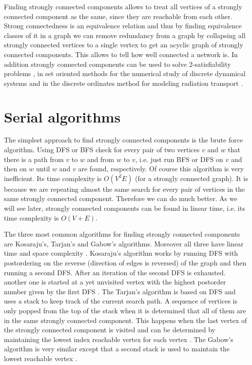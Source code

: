 \documentclass{report}
\theoremstyle{plain}
\theoremstyle{definition}
\theoremstyle{remark}
\numberwithin{definition}{chapter}
\numberwithin{example}{chapter}
\numberwithin{figure}{chapter}
\numberwithin{theorem}{chapter}
\numberwithin{lemma}{chapter}
\begin{document}
Finding strongly connected components allows to treat all vertices of a strongly connected component as the same, since they are reachable from each other. Strong connectedness is an equivalence relation and thus by finding equivalence classes of it in a graph we can remove redundancy from a graph by collapsing all strongly connected vertices to a single vertex to get an acyclic graph of strongly connected components. This allows to tell how well connected a network is. In addition strongly connected components can be used to solve 2-satisfiability problems \cite{aspvall1979linear}, in set oriented methods for the numerical study of discrete dynamical systems \cite{dellnitz2002set} and in the discrete ordinates method for modeling radiation transport \cite{fleischer2000identifying}.

\section{Serial algorithms}

The simplest approach to find strongly connected components is the brute force algorithm. Using DFS or BFS check for every pair of two vertices $v$ and $w$ that there is a path from $v$ to $w$ and from $w$ to $v$, i.e. just run BFS or DFS on $v$ and then on $w$ until $w$ and $v$ are found, respectively. Of course this algorithm is very inefficient. Its time complexity is $O(V^2E)$ (for a strongly connected graph). It is because we are repeating almost the same search for every pair of vertices in the same strongly connected component. Therefore we can do much better. As we will see later, strongly connected components can be found in linear time, i.e. its time complexity is $O(V + E)$.

The three most common algorithms for finding strongly connected components are Kosaraju's, Tarjan's and Gabow's algorithms. Moreover all three have linear time and space complexity \cite{c++_sedgewick}. Kosaraju's algorithm works by running DFS with postordering on the reverse (direction of edges is reversed) of the graph and then running a second DFS. After an iteration of the second DFS is exhausted. another one is started at a yet unvisited vertex with the highest postorder number given by the first DFS \cite{c++_sedgewick}. The Tarjan's algorithm is based on DFS and uses a stack to keep track of the current search path. A sequence of vertices is only popped from the top of the stack when it is determined that all of them are in the same strongly connected component. This happens when the last vertex of the strongly connected component is visited and can be determined by maintaining the lowest index  reachable vertex for each vertex \cite{c++_sedgewick}. The Gabow's algorithm is very similar except that a second stack is used to maintain the lowest reachable vertex \cite{c++_sedgewick}.
\end{document}
